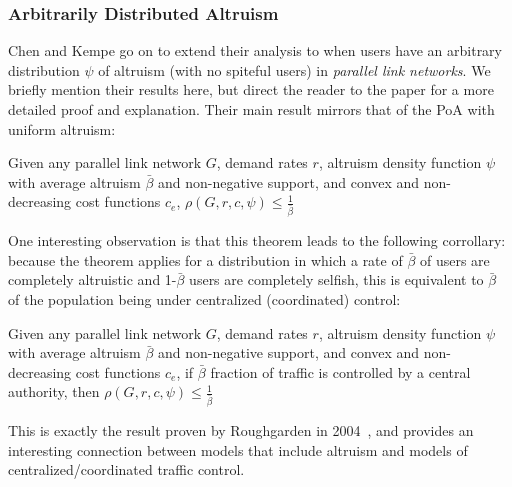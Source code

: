 \subsubsection{Arbitrarily Distributed Altruism}
Chen and Kempe go on to extend their analysis to when users have an arbitrary distribution $\psi$ of altruism (with no spiteful users) in \emph{parallel link networks}. We briefly mention their results here, but direct the reader to the paper for a more detailed proof and explanation. 
Their main result mirrors that of the PoA with uniform altruism:
\begin{theorem}
Given any parallel link network $G$, demand rates $r$, altruism density function $\psi$ with average altruism $\bar{\beta}$ and non-negative support, and convex and non-decreasing cost functions $c_e$,
   $\rho(G,r,c,\psi) \le \frac{1}{\bar{\beta}}$
\end{theorem}
One interesting observation is that this theorem leads to the following corrollary: because the theorem applies for a distribution in which a rate of $\bar{\beta}$ of users are completely altruistic and 1-$\bar{\beta}$ users are completely selfish, this is equivalent to $\bar{\beta}$ of the population being under centralized (coordinated) control:
\begin{corollary}
Given any parallel link network $G$, demand rates $r$, altruism density function $\psi$ with average altruism $\bar{\beta}$ and non-negative support, and convex and non-decreasing cost functions $c_e$,
if $\bar{\beta}$ fraction of traffic is controlled by a central authority, then
   $\rho(G,r,c,\psi) \le \frac{1}{\bar{\beta}}$
\end{corollary}
This is exactly the result proven by Roughgarden in 2004~\cite{roughgarden04}, and provides an interesting connection between models that include altruism and models of centralized/coordinated traffic control.
